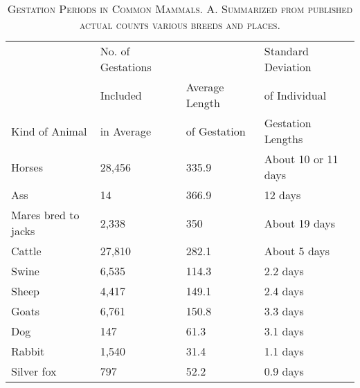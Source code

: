 \begin{table}[t]
	\centering
	\caption{\textsc{Gestation Periods in Common Mammals. A. Summarized from published actual counts various breeds and places.}}
	\label{tbl:Lush_Table_21a}
	\begin{tabular}{L{3.5cm}|C{2.5cm}|C{2.5cm}|L{3.5cm}}
	\hline
	\hline
	~						& No. of Gestations	& ~					& Standard Deviation	\\
	~						& Included			& Average Length	& of Individual			\\
	Kind of Animal			& in Average		& of Gestation		& Gestation Lengths		\\
	\hline
	Horses					& 28,456			& 335.9				& About 10 or 11 days	\\
	Ass 					& 14				& 366.9				& 12 days				\\
	Mares bred to jacks		& 2,338				& 350				& About 19 days			\\
	Cattle					& 27,810			& 282.1				& About 5 days			\\
	Swine					& 6,535				& 114.3				& 2.2 days				\\
	Sheep					& 4,417				& 149.1				& 2.4 days				\\
	Goats					& 6,761				& 150.8				& 3.3 days				\\
	Dog						& 147				& 61.3				& 3.1 days				\\
	Rabbit					& 1,540				& 31.4				& 1.1 days				\\
	Silver fox				& 797				& 52.2				& 0.9 days				\\
	\hline																				
	\end{tabular}
\end{table}

